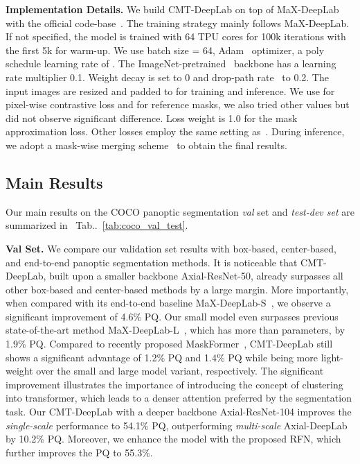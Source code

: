 \documentclass[10pt,twocolumn,letterpaper]{article}
\makeatletter
\DeclareRobustCommand\onedot{\futurelet\@let@token\@onedot}
\def\@onedot{\ifx\@let@token.\else.\null\fi\xspace}
\newcommand{\tabref}[1]{Tab\onedot~\ref{#1}}
\makeatother
\begin{document}
\vspace{0.5ex}
\noindent\textbf{Implementation Details.} We build CMT-DeepLab on top of MaX-DeepLab~\cite{wang2021max} with the official code-base~\cite{deeplab2_2021}. The training strategy mainly follows MaX-DeepLab. If not specified, the model is trained with 64 TPU cores for 100k iterations with the first 5k for warm-up. We use batch size = 64, Adam~\cite{kingma2014adam} optimizer, a poly schedule learning rate of . The ImageNet-pretrained~\cite{russakovsky2015imagenet} backbone has a learning rate multiplier 0.1. Weight decay is set to 0 and drop-path rate~\cite{huang2016deep} to 0.2. The input images are resized and padded to  for training and inference. We use  for pixel-wise contrastive loss and  for reference masks, we also tried other values but did not observe significant difference. Loss weight is 1.0 for the mask approximation loss. Other losses employ the same setting as~\cite{wang2021max}. During inference, we adopt a mask-wise merging scheme~\cite{cheng2021per} to obtain the final results.

\subsection{Main Results}
Our main results on the COCO panoptic segmentation \textit{val} set and \textit{test-dev set} are summarized in ~\tabref{tab:coco_val_test}.

\vspace{0.5ex}
\noindent\textbf{Val Set.} We compare our validation set results with box-based, center-based, and end-to-end panoptic segmentation methods. It is noticeable that CMT-DeepLab, built upon a smaller backbone Axial-ResNet-50, already surpasses all other box-based and center-based methods by a large margin. More importantly, when compared with its end-to-end baseline MaX-DeepLab-S~\cite{wang2021max}, we observe a significant improvement of 4.6\% PQ. Our small model even surpasses previous state-of-the-art method MaX-DeepLab-L~\cite{wang2021max}, which has more than  parameters, by 1.9\% PQ. Compared to recently proposed MaskFormer~\cite{cheng2021per}, CMT-DeepLab still shows a significant advantage of 1.2\% PQ and 1.4\% PQ while being more light-weight over the small and large model variant, respectively. The significant improvement illustrates the importance of introducing the concept of clustering into transformer, which leads to a denser attention preferred by the segmentation task. Our CMT-DeepLab with a deeper backbone Axial-ResNet-104 improves the \textit{single-scale} performance to 54.1\% PQ, outperforming \textit{multi-scale} Axial-DeepLab~\cite{wang2020axial} by 10.2\% PQ. Moreover, we enhance the model with the proposed RFN, which further improves the PQ to 55.3\%.
\end{document}
